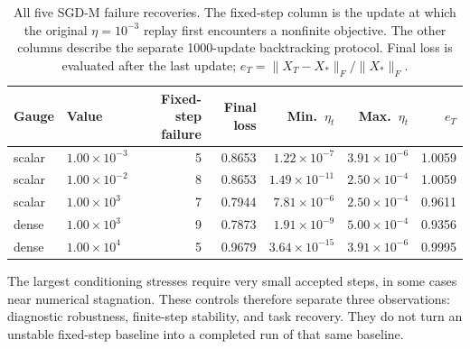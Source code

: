 \begin{table}[ht]
\centering\small
\caption{All five SGD-M failure recoveries. The fixed-step column is the update at which the original $\eta=10^{-3}$ replay first encounters a nonfinite objective. The other columns describe the separate 1000-update backtracking protocol. Final loss is evaluated after the last update; $e_T=\|X_T-X_*\|_F/\|X_*\|_F$.}
\label{tab:failure-recovery}
\setlength{\tabcolsep}{3pt}
\begin{tabular}{llrrrrr}
\toprule Gauge & Value & Fixed-step failure & Final loss & Min.\ $\eta_t$ & Max.\ $\eta_t$ & $e_T$\\\midrule
scalar & $1.00\!\times\!10^{-3}$ & 5 & 0.8653 & $1.22\!\times\!10^{-7}$ & $3.91\!\times\!10^{-6}$ & 1.0059\\
scalar & $1.00\!\times\!10^{-2}$ & 8 & 0.8653 & $1.49\!\times\!10^{-11}$ & $2.50\!\times\!10^{-4}$ & 1.0059\\
scalar & $1.00\!\times\!10^{3}$ & 7 & 0.7944 & $7.81\!\times\!10^{-6}$ & $2.50\!\times\!10^{-4}$ & 0.9611\\
dense & $1.00\!\times\!10^{3}$ & 9 & 0.7873 & $1.91\!\times\!10^{-9}$ & $5.00\!\times\!10^{-4}$ & 0.9356\\
dense & $1.00\!\times\!10^{4}$ & 5 & 0.9679 & $3.64\!\times\!10^{-15}$ & $3.91\!\times\!10^{-6}$ & 0.9995\\
\bottomrule
\end{tabular}
\end{table}
The largest conditioning stresses require very small accepted steps, in some cases near numerical stagnation. These controls therefore separate three observations: diagnostic robustness, finite-step stability, and task recovery. They do not turn an unstable fixed-step baseline into a completed run of that same baseline.
